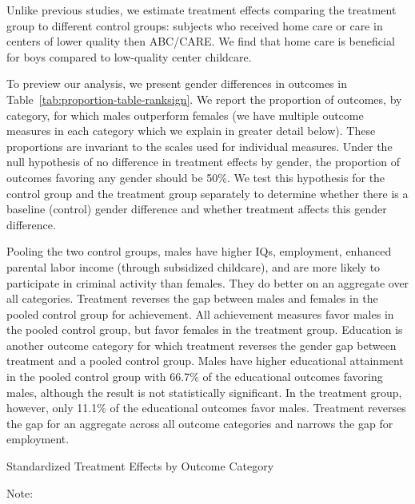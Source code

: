 Unlike previous studies, we estimate treatment effects comparing the treatment group to different control groups: subjects who received home care or care in centers of lower quality then ABC/CARE. We find that home care is beneficial for boys compared to low-quality center childcare.

To preview our analysis, we present gender differences in outcomes in Table~\ref{tab:proportion-table-ranksign}. We report the proportion of outcomes, by category, for which males outperform females (we have multiple outcome measures in each category which we explain in greater detail below). These proportions are invariant to the scales used for individual measures. Under the null hypothesis of no difference in treatment effects by gender, the proportion of outcomes favoring any gender should be 50\%. We test this hypothesis for the control group and the treatment group separately to determine whether there is a baseline (control) gender difference and whether treatment affects this gender difference.

Pooling the two control groups, males have higher IQs, employment, enhanced parental labor income (through subsidized childcare), and are more likely to participate in criminal activity than females. They do better on an aggregate over all categories. Treatment reverses the gap between males and females in the pooled control group for achievement. All achievement measures favor males in the pooled control group, but favor females in the treatment group. Education is another outcome category for which treatment reverses the gender gap between treatment and a pooled control group. Males have higher educational attainment in the pooled control group with 66.7\% of the educational outcomes favoring males, although the result is not statistically significant. In the treatment group, however, only 11.1\% of the educational outcomes favor males. Treatment reverses the gap for an aggregate across all outcome categories and narrows the gap for employment.

\begin{table}[H]
\centering
\caption{Standardized Treatment Effects by Outcome Category}
\label{tab:proportion-table-ranksign}
\begin{threeparttable}

\begin{tablenotes}
\footnotesize
\item Note: 
\end{tablenotes}
\end{threeparttable}
\end{table}

